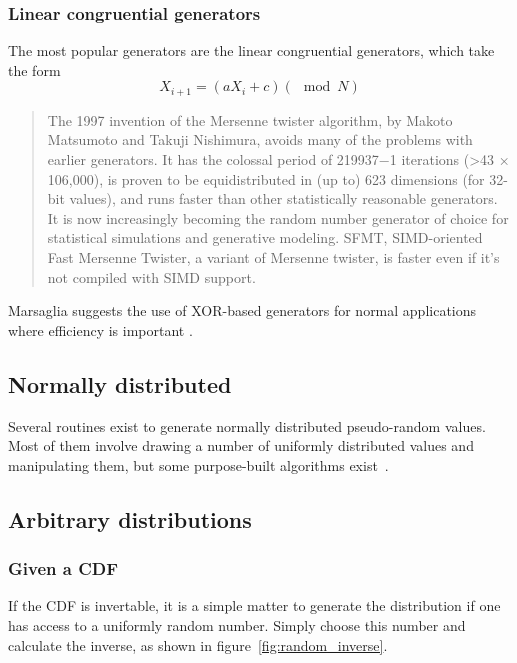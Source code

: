 \subsubsection{Linear congruential generators}
The most popular generators are the linear congruential generators, which take the form \citep[10]{knuth1997art}
\begin{equation}
X_{i+1} = (aX_i +c) (\mod N)
\end{equation}

\begin{quote}
The 1997 invention of the Mersenne twister algorithm, by Makoto Matsumoto and Takuji Nishimura, avoids many of the problems with earlier generators.
It has the colossal period of 219937−1 iterations (>43 × 106,000), is proven to be equidistributed in (up to) 623 dimensions (for 32-bit values), and runs faster than other statistically reasonable generators. 
It is now increasingly becoming the random number generator of choice for statistical simulations and generative modeling. 
SFMT, SIMD-oriented Fast Mersenne Twister, a variant of Mersenne twister, is faster even if it's not compiled with SIMD support.
\end{quote}

Marsaglia suggests the use of XOR-based generators for normal
applications where efficiency is important \citehere.

\subsection{Normally distributed}
Several routines exist to generate normally distributed pseudo-random values.  
Most of them involve drawing a number of uniformly distributed values and manipulating them, but some purpose-built algorithms exist~\citehere.

\subsection{Arbitrary distributions}

\subsubsection{Given a CDF}
If the CDF is invertable, it is a simple matter to generate the distribution if one has access to a uniformly random number.
Simply choose this number and calculate the inverse, as shown in figure~\ref{fig:random_inverse}.

